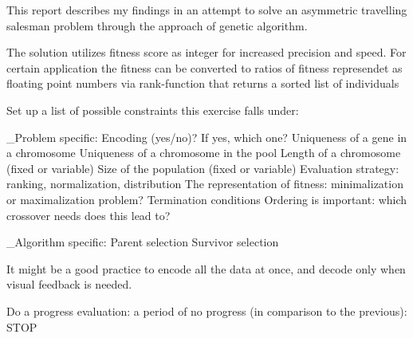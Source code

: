 This report describes my findings in an attempt to solve an
asymmetric travelling salesman problem through the approach
of genetic algorithm.

The solution utilizes fitness score as integer for increased precision
and speed. For certain application the fitness can be converted to
ratios of fitness represendet as floating point numbers via rank-function
that returns a sorted list of individuals


Set up a list of possible constraints this exercise falls under:

    _Problem specific:
    Encoding (yes/no)? If yes, which one?
    Uniqueness of a gene in a chromosome
    Uniqueness of a chromosome in the pool
    Length of a chromosome (fixed or variable)
    Size of the population (fixed or variable)
    Evaluation strategy: ranking, normalization, distribution
    The representation of fitness: minimalization or maximalization problem?
    Termination conditions
    Ordering is important: which crossover needs does this lead to?


    _Algorithm specific:
    Parent selection
    Survivor selection


It might be a good practice to encode all the data at once, and decode only
when visual feedback is needed.

Do a progress evaluation: a period of no progress
(in comparison to the previous): STOP

